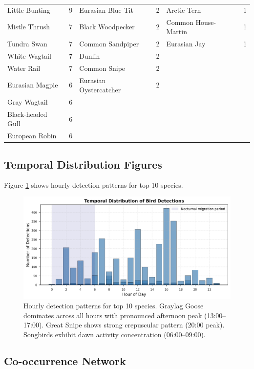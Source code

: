 \documentclass[twocolumn]{article}
\begin{document}
\begin{table}[H]
\begin{tabular}{lr|lr|lr}
Little Bunting & 9 & Eurasian Blue Tit & 2 & Arctic Tern & 1 \\
Mistle Thrush & 7 & Black Woodpecker & 2 & Common House-Martin & 1 \\
Tundra Swan & 7 & Common Sandpiper & 2 & Eurasian Jay & 1 \\
White Wagtail & 7 & Dunlin & 2 &  &  \\
Water Rail & 7 & Common Snipe & 2 &  &  \\
Eurasian Magpie & 6 & Eurasian Oystercatcher & 2 &  &  \\
Gray Wagtail & 6 &  &  &  &  \\
Black-headed Gull & 6 &  &  &  &  \\
European Robin & 6 &  &  &  &  \\
\bottomrule
\end{tabular}
\end{table}

\subsection{Temporal Distribution Figures}

Figure \ref{fig:temporal} shows hourly detection patterns for top 10 species.

\begin{figure}[H]
\centering
\includegraphics[width=\textwidth]{figures/temporal_distribution.png}
\caption{Hourly detection patterns for top 10 species. Graylag Goose dominates across all hours with pronounced afternoon peak (13:00--17:00). Great Snipe shows strong crepuscular pattern (20:00 peak). Songbirds exhibit dawn activity concentration (06:00--09:00).}
\label{fig:temporal}
\end{figure}

\subsection{Co-occurrence Network}
\end{document}
